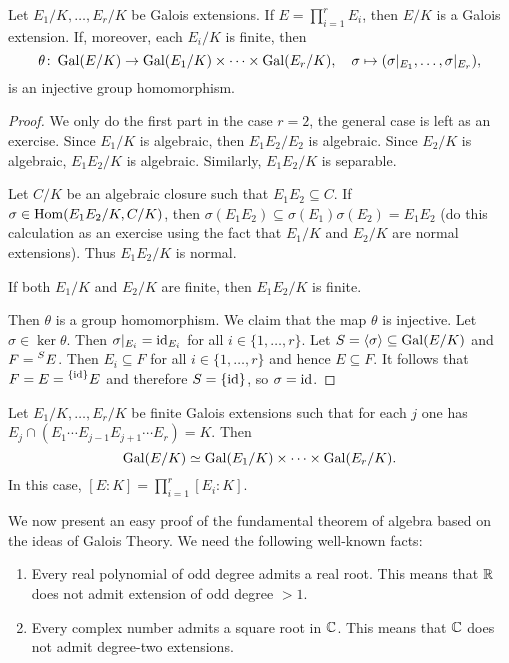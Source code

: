 \begin{proposition}
Let $E_1/K,\dots,E_r/K$ be Galois extensions. 
If $E=\prod_{i=1}^rE_i$, then $E/K$ is a Galois extension. If, moreover, each $E_i/K$ is finite,
then 
\[
\theta\colon \operatorname{Gal}(E/K)\to \operatorname{Gal}(E_1/K)\times\cdots\times\operatorname{Gal}(E_r/K),
\quad
\sigma\mapsto(\sigma|_{E_1},\dots,\sigma|_{E_r}),
\]
is an injective group homomorphism.
\end{proposition}

\begin{proof}
    We only do the first part in the case $r=2$, the general case is left as an exercise. Since $E_1/K$ is algebraic, 
    then $E_1E_2/E_2$ is algebraic. Since $E_2/K$ is algebraic, $E_1E_2/K$ is algebraic. Similarly, 
    $E_1E_2/K$ is separable. 
    
    Let $C/K$ be an algebraic closure such that $E_1E_2\subseteq C$. If $\sigma\in\operatorname{Hom}(E_1E_2/K,C/K)$, then 
    $\sigma(E_1E_2)\subseteq\sigma(E_1)\sigma(E_2)=E_1E_2$ (do this calculation as an exercise using the fact that
    $E_1/K$ and $E_2/K$ are normal extensions). 
    Thus $E_1E_2/K$ is normal. 
    
    If both $E_1/K$ and $E_2/K$ are finite, then $E_1E_2/K$ is finite. 
    
    Then $\theta$ is a group homomorphism. We claim that the map $\theta$ is injective. Let $\sigma\in\ker\theta$. Then
    $\sigma|_{E_i}=\operatorname{id}_{E_i}$ for all $i\in\{1,\dots,r\}$. Let $S=\langle\sigma\rangle\subseteq\operatorname{Gal}(E/K)$ and
    $F=\prescript{S}{}{E}$. Then $E_i\subseteq F$ for all $i\in\{1,\dots,r\}$ and
    hence $E\subseteq F$. It follows that $F=E=\prescript{\{\operatorname{id}\}}{}{E}$ and therefore $S=\{\operatorname{id}\}$, so 
    $\sigma=\operatorname{id}$. 
\end{proof}

\begin{exercise}
    Let $E_1/K,\dots,E_r/K$ be finite Galois extensions such that for each $j$ 
    one has $E_j\cap (E_1\cdots E_{j-1}E_{j+1}\cdots E_r)=K$. Then 
    \[
    \operatorname{Gal}(E/K)\simeq\operatorname{Gal}(E_1/K)\times\cdots\times\operatorname{Gal}(E_r/K).
    \]
    In this case, $[E:K]=\prod_{i=1}^r[E_i:K]$. 
\end{exercise}


We now present an easy proof of the fundamental theorem 
of algebra based on the ideas of Galois Theory. 
We need the following well-known facts:
\begin{enumerate}
\item Every real polynomial of odd degree admits a real root. This means that $\mathbb{R}$ 
does not admit extension of odd degree $>1$. 
\item Every complex number admits a square root in $\mathbb{C}$. This means that $\mathbb{C}$ 
does not admit degree-two extensions.
\end{enumerate}

